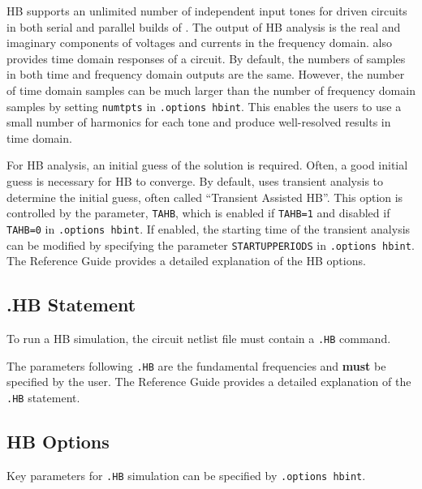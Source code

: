 HB supports an unlimited number of independent input tones for driven
circuits in both serial and parallel builds of \Xyce{}. The output of
HB analysis is the real and imaginary components of voltages and
currents in the frequency domain. \Xyce{} also provides time domain
responses of a circuit. By default, the numbers of samples in both
time and frequency domain outputs are the same.  However, the number
of time domain samples can be much larger than the number of frequency
domain samples by setting \verb|numtpts| in
\verb|.options hbint|. This enables the users to use a small number of
harmonics for each tone and produce well-resolved results in time
domain.

For HB analysis, an initial guess of the solution is required. Often,
a good initial guess is necessary for HB to converge. By default,
\Xyce{} uses transient analysis to determine the initial guess, often
called ``Transient Assisted HB''.  This option is controlled by the
parameter, \verb|TAHB|, which is enabled if \verb|TAHB=1| and disabled
if \verb|TAHB=0| in \verb|.options hbint|. If enabled, the starting
time of the transient analysis can be modified by specifying the
parameter \verb|STARTUPPERIODS| in \verb|.options hbint|. The \Xyce{}
Reference Guide\ReferenceGuide{} provides a detailed explanation of
the HB options.

\subsection{.HB Statement}

To run a HB simulation, the circuit netlist file must contain a \verb|.HB| command.


The parameters following \verb|.HB| are the fundamental frequencies and {\bf must} be
specified by the user. The \Xyce{} Reference Guide\ReferenceGuide{} provides a detailed 
explanation of the \verb|.HB| statement.


\subsection{HB Options}

Key parameters for \verb|.HB| simulation can be specified by
\verb|.options hbint|.
 

